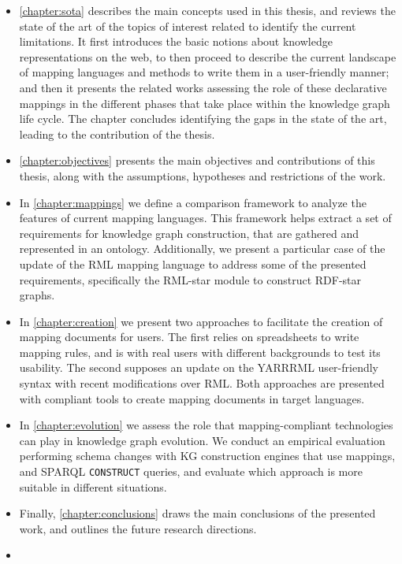 \begin{itemize}
    \item \cref{chapter:sota} describes the main concepts used in this thesis, and reviews the state of the art of the topics of interest related to identify the current limitations. It first introduces the basic notions about knowledge representations on the web, to then proceed to describe the current landscape of mapping languages and methods to write them in a user-friendly manner; and then it presents the related works assessing the role of these declarative mappings in the different phases that take place within the knowledge graph life cycle. The chapter concludes identifying the gaps in the state of the art, leading to the contribution of the thesis.
    
    \item \cref{chapter:objectives} presents the main objectives and contributions of this thesis, along with the assumptions, hypotheses and restrictions of the work. 
    
    \item In \cref{chapter:mappings} we define a comparison framework to analyze the features of current mapping languages. This framework helps extract a set of requirements for knowledge graph construction, that are gathered and represented in an ontology. Additionally, we present a particular case of the update of the RML mapping language to address some of the presented requirements, specifically the RML-star module to construct RDF-star graphs.
    
    \item In \cref{chapter:creation} we present two approaches to facilitate the creation of mapping documents for users. The first relies on spreadsheets to write mapping rules, and is with real users with different backgrounds to test its usability. The second supposes an update on the YARRRML user-friendly syntax with recent modifications over RML. Both approaches are presented with compliant tools to create mapping documents in target languages. 
    
    \item In \cref{chapter:evolution} we assess the role that mapping-compliant technologies can play in knowledge graph evolution. We conduct an empirical evaluation performing schema changes with KG construction engines that use mappings, and SPARQL \texttt{CONSTRUCT} queries, and evaluate which approach is more suitable in different situations. 
    
    \item Finally, \cref{chapter:conclusions} draws the main conclusions of the presented work, and outlines the future research directions. 
    
    \item {}
\end{itemize}


